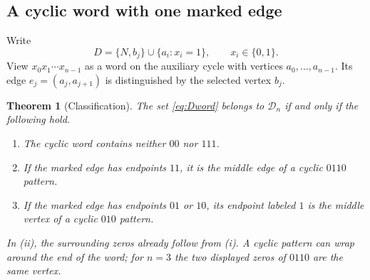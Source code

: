 \documentclass[11pt,letterpaper]{article}
\numberwithin{equation}{section}
\newtheorem{theorem}{Theorem}[section]
\theoremstyle{definition}
\newcommand{\CM}{\mathcal D}
\newcommand{\1}{\mathbf 1}
\begin{document}
\subsection{A cyclic word with one marked edge}
Write
\begin{equation}\label{eq:Dword}
 D=\{N,b_j\}\cup\{a_i:x_i=1\},\qquad x_i\in\{0,1\}.
\end{equation}
View $x_0x_1\cdots x_{n-1}$ as a word on the auxiliary cycle with vertices
$a_0,\ldots,a_{n-1}$. Its edge $e_j=(a_j,a_{j+1})$ is distinguished by the
selected vertex $b_j$.

\begin{theorem}[Classification]\label{thm:classification}
The set \eqref{eq:Dword} belongs to $\CM_n$ if and only if the following hold.
\begin{enumerate}[label=\textnormal{(\roman*)},leftmargin=2.4em,itemsep=2pt]
\item The cyclic word contains neither $00$ nor $111$.
\item If the marked edge has endpoints $11$, it is the middle edge of a cyclic
$0110$ pattern.
\item If the marked edge has endpoints $01$ or $10$, its endpoint labeled $1$
is the middle vertex of a cyclic $010$ pattern.
\end{enumerate}
In (ii), the surrounding zeros already follow from (i). A cyclic pattern can
wrap around the end of the word; for $n=3$ the two displayed zeros of $0110$
are the same vertex.
\end{theorem}
\end{document}

